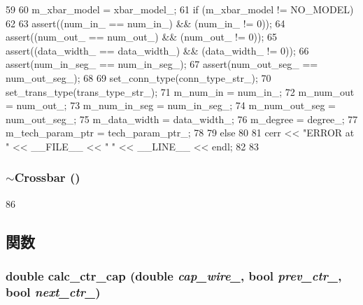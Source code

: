 \begin{DoxyCode}
59 {
60     m_xbar_model = xbar_model_;
61     if (m_xbar_model != NO_MODEL)
62     {
63         assert((num_in_ == num_in_) && (num_in_ != 0));
64         assert((num_out_ == num_out_) && (num_out_ != 0));
65         assert((data_width_ == data_width_) && (data_width_ != 0));
66         assert(num_in_seg_ == num_in_seg_);
67         assert(num_out_seg_ == num_out_seg_);
68 
69         set_conn_type(conn_type_str_);
70         set_trans_type(trans_type_str_);
71         m_num_in = num_in_;
72         m_num_out = num_out_;
73         m_num_in_seg = num_in_seg_;
74         m_num_out_seg = num_out_seg_;
75         m_data_width = data_width_;
76         m_degree = degree_;
77         m_tech_param_ptr = tech_param_ptr_;
78     }
79     else
80     {
81         cerr << "ERROR at " << __FILE__ << " " << __LINE__ << endl;
82     }
83 }
\end{DoxyCode}
\hypertarget{classCrossbar_a7e9410d2e04e2e7b83f7a31595dd74e9}{
\subsubsection[{$\sim$Crossbar}]{\setlength{\rightskip}{0pt plus 5cm}$\sim${\bf Crossbar} ()}}
\label{classCrossbar_a7e9410d2e04e2e7b83f7a31595dd74e9}



\begin{DoxyCode}
86 {}
\end{DoxyCode}


\subsection{関数}
\hypertarget{classCrossbar_ace433381d49ba5c6e19fd0e11a207b29}{
\subsubsection[{calc\_\-ctr\_\-cap}]{\setlength{\rightskip}{0pt plus 5cm}double calc\_\-ctr\_\-cap (double {\em cap\_\-wire\_\-}, \/  bool {\em prev\_\-ctr\_\-}, \/  bool {\em next\_\-ctr\_\-})}}
\label{classCrossbar_ace433381d49ba5c6e19fd0e11a207b29}




